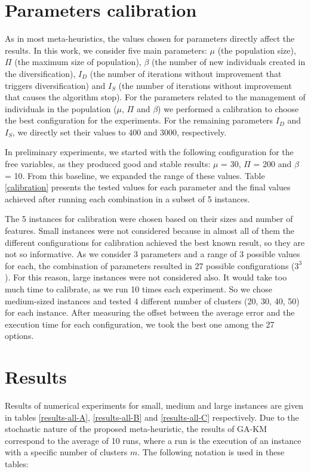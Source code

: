 \section{Parameters calibration}
As in most meta-heuristics, the values chosen for parameters directly affect the results. In this work, we consider five main parameters: $\mu$ (the population size), $\Pi$ (the maximum size of population), $\beta$ (the number of new individuals created in the diversification), $I_D$ (the number of iterations without improvement that triggers diversification) and $I_S$ (the number of iterations without improvement that causes the algorithm stop). For the parameters related to the management of individuals in the population ($\mu$, $\Pi$ and $\beta$) we performed a calibration to choose the best configuration for the experiments. For the remaining parameters $I_D$ and $I_S$, we directly set their values to 400 and 3000, respectively.

In preliminary experiments, we started with the following configuration for the free variables, as they produced good and stable results: $\mu$ = 30, $\Pi$ = 200 and $\beta$ = 10. From this baseline, we expanded the range of these values. Table \ref{calibration} presents the tested values for each parameter and the final values achieved after running each combination in a subset of 5 instances.

The 5 instances for calibration were chosen based on their sizes and number of features. Small instances were not considered because in almost all of them the different configurations for calibration achieved the best known result, so they are not so informative. As we consider 3 parameters and a range of 3 possible values for each, the combination of parameters resulted in 27 possible configurations ($3^3$). For this reason, large instances were not considered also. It would take too much time to calibrate, as we run 10 times each experiment. So we chose medium-sized instances and tested 4 different number of clusters (20, 30, 40, 50) for each instance. After measuring the offset between the average error and the execution time for each configuration, we took the best one among the 27 options.



\section{Results}
Results of numerical experiments for small, medium and large instances are given in tables \ref{results-all-A}, \ref{results-all-B} and \ref{results-all-C} respectively. Due to the stochastic nature of the proposed meta-heuristic, the results of GA-KM correspond to the average of 10 runs, where a run is the execution of an instance with a specific number of clusters $m$. The following notation is used in these tables:

